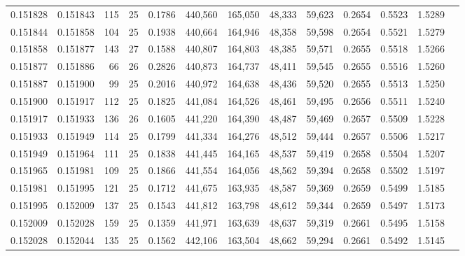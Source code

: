 \begin{tabular}{rrrrrrrrrrrrr}
0.151828 & 0.151843 &   115 &  25 &                                     0.1786 & 440,560 & 165,050 &  48,333 &  59,623 & 0.2654 & 0.5523 & 1.5289 \\
0.151844 & 0.151858 &   104 &  25 &                                     0.1938 & 440,664 & 164,946 &  48,358 &  59,598 & 0.2654 & 0.5521 & 1.5279 \\
0.151858 & 0.151877 &   143 &  27 &                                     0.1588 & 440,807 & 164,803 &  48,385 &  59,571 & 0.2655 & 0.5518 & 1.5266 \\
0.151877 & 0.151886 &    66 &  26 &                                     0.2826 & 440,873 & 164,737 &  48,411 &  59,545 & 0.2655 & 0.5516 & 1.5260 \\
0.151887 & 0.151900 &    99 &  25 &                                     0.2016 & 440,972 & 164,638 &  48,436 &  59,520 & 0.2655 & 0.5513 & 1.5250 \\
0.151900 & 0.151917 &   112 &  25 &                                     0.1825 & 441,084 & 164,526 &  48,461 &  59,495 & 0.2656 & 0.5511 & 1.5240 \\
0.151917 & 0.151933 &   136 &  26 &                                     0.1605 & 441,220 & 164,390 &  48,487 &  59,469 & 0.2657 & 0.5509 & 1.5228 \\
0.151933 & 0.151949 &   114 &  25 &                                     0.1799 & 441,334 & 164,276 &  48,512 &  59,444 & 0.2657 & 0.5506 & 1.5217 \\
0.151949 & 0.151964 &   111 &  25 &                                     0.1838 & 441,445 & 164,165 &  48,537 &  59,419 & 0.2658 & 0.5504 & 1.5207 \\
0.151965 & 0.151981 &   109 &  25 &                                     0.1866 & 441,554 & 164,056 &  48,562 &  59,394 & 0.2658 & 0.5502 & 1.5197 \\
0.151981 & 0.151995 &   121 &  25 &                                     0.1712 & 441,675 & 163,935 &  48,587 &  59,369 & 0.2659 & 0.5499 & 1.5185 \\
0.151995 & 0.152009 &   137 &  25 &                                     0.1543 & 441,812 & 163,798 &  48,612 &  59,344 & 0.2659 & 0.5497 & 1.5173 \\
0.152009 & 0.152028 &   159 &  25 &                                     0.1359 & 441,971 & 163,639 &  48,637 &  59,319 & 0.2661 & 0.5495 & 1.5158 \\
0.152028 & 0.152044 &   135 &  25 &                                     0.1562 & 442,106 & 163,504 &  48,662 &  59,294 & 0.2661 & 0.5492 & 1.5145 \\

\end{tabular}
